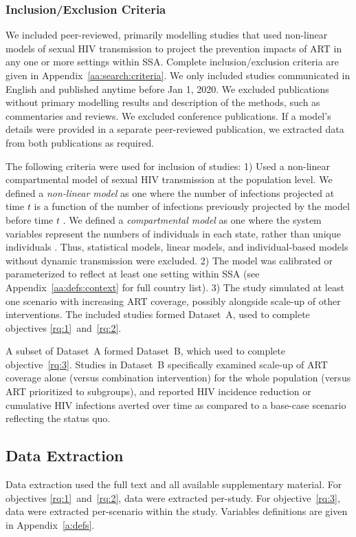 \subsubsection{Inclusion/Exclusion Criteria}
\label{sss:meth:criteria}
We included peer-reviewed, primarily modelling studies that used non-linear models of sexual HIV transmission
to project the prevention impacts of ART in any one or more settings within SSA.
Complete inclusion/exclusion criteria are given in Appendix~\ref{aa:search:criteria}.
We only included studies communicated in English and published anytime before Jan 1, 2020.
We excluded publications without primary modelling results and description of the methods,
such as commentaries and reviews.
We excluded conference publications.
If a model's details were provided in a separate peer-reviewed publication,
we extracted data from both publications as required.
\par
The following criteria were used for inclusion of studies:
1) Used a non-linear compartmental model of
sexual HIV transmission at the population level.
We defined a \emph{non-linear model} as one where
the number of infections projected at time $t$ is a function of
the number of infections previously projected by the model before time $t$ \cite{Garnett2011}.
We defined a \emph{compartmental model} as one where
the system variables represent the numbers of individuals in each state,
rather than unique individuals \cite{Garnett2011}.
Thus, statistical models, linear models, and individual-based models without dynamic transmission were excluded.
2) The model was calibrated or parameterized to reflect at least one setting within SSA
(see Appendix~\ref{aa:defs:context} for full country list).
3) The study simulated at least one scenario with increasing ART coverage,
possibly alongside scale-up of other interventions.
The included studies formed Dataset~A,
used to complete objectives \ref{rq:1}~and~\ref{rq:2}.
\par
A subset of Dataset~A formed Dataset~B,
which used to complete objective~\ref{rq:3}.
Studies in Dataset~B specifically examined
scale-up of ART coverage alone (versus combination intervention)
for the whole population (versus ART prioritized to subgroups),
and reported HIV incidence reduction or cumulative HIV infections averted over time 
as compared to a base-case scenario reflecting the status quo.
\subsection{Data Extraction}
\label{ss:meth:data}
Data extraction used the full text and all available supplementary material.
For objectives \ref{rq:1}~and~\ref{rq:2}, data were extracted per-study.
For objective~\ref{rq:3}, data were extracted per-scenario within the study.
Variables definitions are given in Appendix~\ref{a:defs}.
